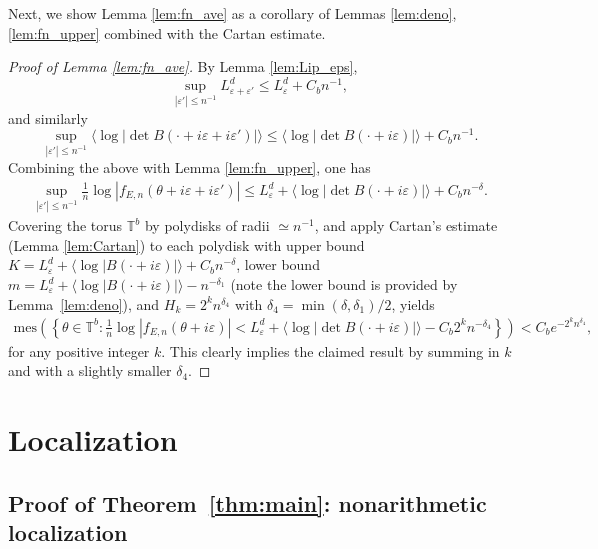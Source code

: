 \documentclass[11pt]{amsart}
\newcommand{\T}{\mathbb T}
\begin{document}
Next, we show Lemma \ref{lem:fn_ave} as a corollary of 
Lemmas \ref{lem:deno}, \ref{lem:fn_upper} combined with the Cartan estimate.
\begin{proof}[Proof of Lemma \ref{lem:fn_ave}]
    By Lemma \ref{lem:Lip_eps}, 
    \[\sup_{|\varepsilon'|\leq n^{-1}}L^d_{\varepsilon+\varepsilon'}\leq L^d_{\varepsilon}+C_b n^{-1},\]
    and similarly 
    \[\sup_{|\varepsilon'|\leq n^{-1}}\langle \log|\det B(\cdot+i\varepsilon+i\varepsilon')|\rangle \leq \langle \log|\det B(\cdot+i\varepsilon)|\rangle+C_b n^{-1}.\]
    Combining the above with Lemma \ref{lem:fn_upper}, one has 
    \begin{align}
        \sup_{|\varepsilon'|\leq n^{-1}}\frac{1}{n}\log |f_{E,n}(\theta+i\varepsilon+i\varepsilon')|\leq L^d_{\varepsilon}+\langle \log|\det B(\cdot+i\varepsilon)|\rangle+C_b n^{-\delta}.
    \end{align}
Covering the torus $\T^b$ by polydisks of radii $\simeq n^{-1}$, and apply Cartan's estimate (Lemma \ref{lem:Cartan}) to each  polydisk with upper bound $K=L^d_{\varepsilon}+\langle \log|B(\cdot+i\varepsilon)|\rangle+C_b n^{-\delta}$, lower bound $m=L^d_{\varepsilon}+\langle \log |B(\cdot+i\varepsilon)|\rangle -n^{-\delta_1}$ (note the lower bound is provided by Lemma~\ref{lem:deno}), and $H_k=2^k n^{\delta_4}$ with $\delta_4=\min(\delta,\delta_1)/2$, yields
\begin{align}
    \mathrm{mes}\left(\left\{\theta\in \T^b: \frac{1}{n}\log |f_{E,n}(\theta+i\varepsilon)|<L^d_{\varepsilon}+\langle \log |\det B(\cdot+i\varepsilon)|\rangle-C_b 2^k n^{-\delta_4}\right\}\right)<C_b e^{-2^k n^{\delta_4}},
\end{align}
for any positive integer $k$. 
This clearly implies the claimed result by summing in $k$ and with a slightly smaller $\delta_4$.
\end{proof}


\section{Localization}

\subsection{Proof of Theorem~\ref{thm:main}: nonarithmetic localization}\label{sec:main}
\end{document}
